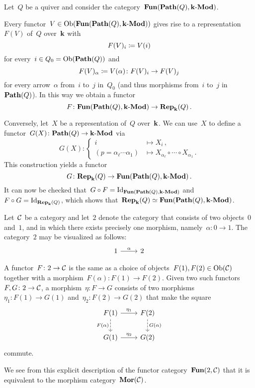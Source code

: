 \begin{example}
  Let~$Q$ be a quiver and consider the category~$\mathbf{Fun}(\mathbf{Path}(Q),\text{$\mathbf{k}$-$\mathbf{Mod}$})$.
  
  Every functor~$V \in \operatorname{Ob}(\mathbf{Fun}(\mathbf{Path}(Q),\text{$\mathbf{k}$-$\mathbf{Mod}$}))$ gives rise to a representation~$F(V)$ of~$Q$ over~$\mathbf{k}$ with
  \[
              F(V)_i
    \coloneqq  V(i)
  \]
  for every~$i \in Q_0 = \operatorname{Ob}(\mathbf{Path}(Q))$ and
  \[
              F(V)_\alpha
    \coloneqq  V(\alpha)
    \colon    F(V)_i
    \to       F(V)_j
  \]
  for every arrow~$\alpha$ from~$i$ to~$j$ in~$Q_0$ (and thus morphisms from~$i$ to~$j$ in~$\mathbf{Path}(Q)$).
  In this way we obtain a functor
  \[
            F
    \colon  \mathbf{Fun}(\mathbf{Path}(Q), \text{$\mathbf{k}$-$\mathbf{Mod}$})
    \to     \mathbf{Rep}_{\mathbf{k}}(Q)  \,.
  \]
  
  Conversely, let~$X$ be a representation of~$Q$ over~$\mathbf{k}$.
  We can use~$X$ to define a functor~$G(X) \colon \mathbf{Path}(Q) \to \text{$\mathbf{k}$-$\mathbf{Mod}$}$ via
  \[
            G(X)
    \colon  \left\{
              \begin{aligned}
                          i
                &\mapsto  X_i \,, \\
                          (p = \alpha_\ell \dotsm \alpha_1)
                &\mapsto  X_{\alpha_\ell} \circ \dotsb \circ X_{\alpha_1} \,.
              \end{aligned}
            \right.
  \]
  This construction yields a functor
  \[
            G
    \colon  \mathbf{Rep}_{\mathbf{k}}(Q)
    \to     \mathbf{Fun}(\mathbf{Path}(Q), \text{$\mathbf{k}$-$\mathbf{Mod}$}) \,.
  \]
  It can now be checked that~$G \circ F = \mathrm{Id}_{\mathbf{Fun}(\mathbf{Path}(Q), \text{$\mathbf{k}$-$\mathbf{Mod}$})}$ and~$F \circ G = \mathrm{Id}_{\mathbf{Rep}_{\mathbf{k}}(Q)}$, which shows that~$\mathbf{Rep}_{\mathbf{k}}(Q) \simeq \mathbf{Fun}(\mathbf{Path}(Q), \text{$\mathbf{k}$-$\mathbf{Mod}$})$.
\end{example}


\begin{example*}
  \label{morphism category is a functor category}
  Let~$\mathcal{C}$ be a category and let~$2$ denote the category that consists of two objects~$0$ and~$1$, and in which there exists precisely one  morphism, namely~$\alpha \colon 0 \to 1$.
  The category~$2$ may be visualized as follows:
  \[
    \begin{tikzcd}
        1
        \arrow{r}[above]{\alpha}
      & 2
    \end{tikzcd}
  \]
  
  A functor~$F \colon 2 \to \mathcal{C}$ is the same as a choice of objects~$F(1), F(2) \in \operatorname{Ob}(\mathcal{C})$ together with a morphism~$F(\alpha) \colon F(1) \to F(2)$.
  Given two such functors~$F, G \colon 2 \to \mathcal{C}$, a morphism~$\eta \colon F \to G$ consists of two morphisms~$\eta_1 \colon F(1) \to G(1)$ and~$\eta_2 \colon F(2) \to G(2)$ that make the square
  \[
    \begin{tikzcd}
        F(1)
        \arrow{r}[above]{\eta_1}
        \arrow[dashed]{d}[left]{F(\alpha)}
      & F(2)
        \arrow[dashed]{d}[right]{G(\alpha)}
      \\
        G(1)
        \arrow{r}[above]{\eta_2}
      & G(2)
    \end{tikzcd}
  \]
  commute.
  
  We see from this explicit description of the functor category~$\mathbf{Fun}(2, \mathcal{C})$ that it is equivalent to the morphism category~$\mathbf{Mor}(\mathcal{C})$.
\end{example*}



